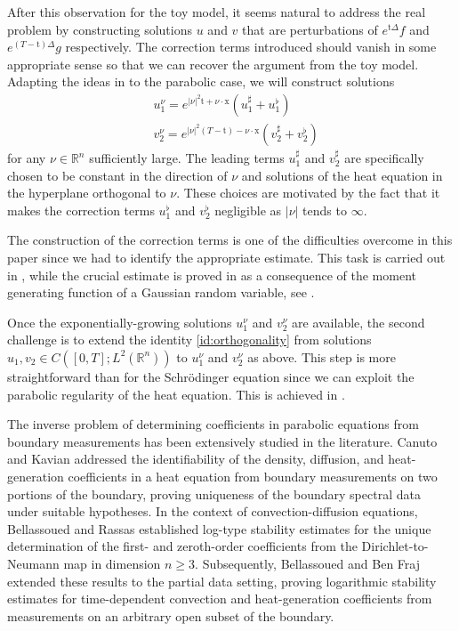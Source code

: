 \documentclass[10pt,a4paper]{amsart}
\newcommand{\R}{\mathbb{R}}
\newcommand{\tm}{\mathrm{t}}
\newcommand{\x}{\mathrm{x}}
\begin{document}
After this observation for the toy model, it seems natural to address the real problem
by constructing solutions $u$ and $v$ that are perturbations of $e^{\tm \Delta}f$ and 
$e^{(T - \tm) \Delta}g$ respectively. The correction terms introduced should vanish in some 
appropriate sense so that we can recover the argument from the toy model. Adapting the ideas in 
\cite{zbMATH07801151} to the parabolic case, we will construct solutions
\begin{align*}
& u_1^\nu = e^{|\nu|^2 \tm + \nu \cdot \x} (u_1^\sharp + u_1^\flat)\\
& v_2^\nu = e^{|\nu|^2 (T - \tm) - \nu \cdot \x} (v_2^\sharp + v_2^\flat)
\end{align*}
for any $\nu \in \R^n $ sufficiently large. The leading terms $u_1^\sharp$ and $v_2^\sharp$ are
specifically chosen to be constant in the direction of $\nu$ and solutions of the heat equation in 
the hyperplane orthogonal to $\nu$. These choices are motivated by the fact that it makes the 
correction terms $u_1^\flat$ and $v_2^\flat$ negligible as $|\nu| $ tends to $ \infty$.

The construction of the correction terms is one of the difficulties overcome in this paper since we 
had to identify the appropriate estimate. This task is carried out in , while the
crucial estimate is proved in  as a consequence of 
the moment generating function of a Gaussian random variable, see .

Once the exponentially-growing solutions $u_1^\nu$ and $v_2^\nu$ are available,
the second challenge is to extend the identity \eqref{id:orthogonality} from solutions 
$u_1, v_2 \in C([0,T]; L^2(\R^n))$ to $u_1^\nu$ and $v_2^\nu$ as above.
This step is more straightforward than for the Schrödinger equation since we can exploit the 
parabolic regularity of the heat equation. This is achieved in .

The inverse problem of determining coefficients in parabolic equations from boundary measurements has been extensively studied in the literature. Canuto and Kavian \cite{zbMATH01578850} addressed the identifiability of the density, diffusion, and heat-generation coefficients in a heat equation from boundary measurements on two portions of the boundary, proving uniqueness of the boundary spectral data under suitable hypotheses. In the context of convection-diffusion equations, Bellassoued and Rassas \cite{zbMATH07173395} established log-type stability estimates for the unique determination of the first- and zeroth-order coefficients from the Dirichlet-to-Neumann map in dimension $n \geq 3$. Subsequently, Bellassoued and Ben Fraj \cite{zbMATH07335388} extended these results to the partial data setting, proving logarithmic stability estimates for time-dependent convection and heat-generation coefficients from measurements on an arbitrary open subset of the boundary.
\end{document}
